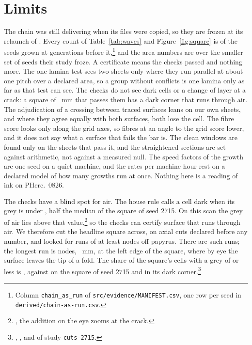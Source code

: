 \section{Limits}

The chain was still delivering when its files were copied, so they are frozen at its relaunch of \ChainFreezeTime{}.
Every count of Table~\ref{tab:waves} and Figure~\ref{fig:square} is of the seeds grown at \ChainGenCap{} generations
before it,\footnote{Column \texttt{chain\_as\_run} of \texttt{src/evidence/MANIFEST.csv}, one row per seed in
\texttt{derived/chain-as-run.csv}.} and the area numbers are over the smaller set of seeds their study froze. A
certificate means the checks passed and nothing more. The one lamina test sees two sheets only where they run parallel
at about one pitch over a declared area, so a group without conflicts is one lamina only as far as that test can see.
The checks do not see dark cells or a change of layer at a crack: a square of \RdSquare{}~mm that passes them has a
dark corner that runs through air. The adjudication of a crossing between traced surfaces leans on our own sheets, and where they agree equally with both
surfaces, both lose the cell. The fibre score looks only along the grid axes, so fibres at an angle to the grid score
lower, and it does not say what a surface that fails the bar is. The clean windows are found only on the sheets that
pass it, and the straightened sections are set against arithmetic, not against a measured null. The speed factors of
the growth are one seed on a quiet machine, and the rates per machine hour rest on a declared model of how many growths
run at once. Nothing here is a reading of ink on PHerc.~0826.

The checks have a blind spot for air. The house rule calls a cell dark when its grey is under \CutsDarkT{}, half the
median of the square of seed 2715. On this scan the grey of air lies above that value,\footnote{, the addition on the eye zooms at the crack.} so the checks can certify surface that
runs through air. We therefore cut the headline square across, on \CutsHead{} axial cuts declared before any number,
and looked for runs of at least \CutsVoidRun{} nodes off papyrus. There are \CutsHeadRuns{} such runs; the longest run is
\CutsHeadLongest{} nodes, \CutsHeadLongestMm{}~mm, at the left edge of the square, where by eye the surface leaves the
tip of a fold. The share of the square's cells with a grey of \CutsAirBar{} or less is \CutsAirHead{}, against
\CutsAirRd{} on the square of seed 2715 and \CutsAirCorner{} in its dark corner.\footnote{,
,  and  of study \texttt{cuts-2715}.}

